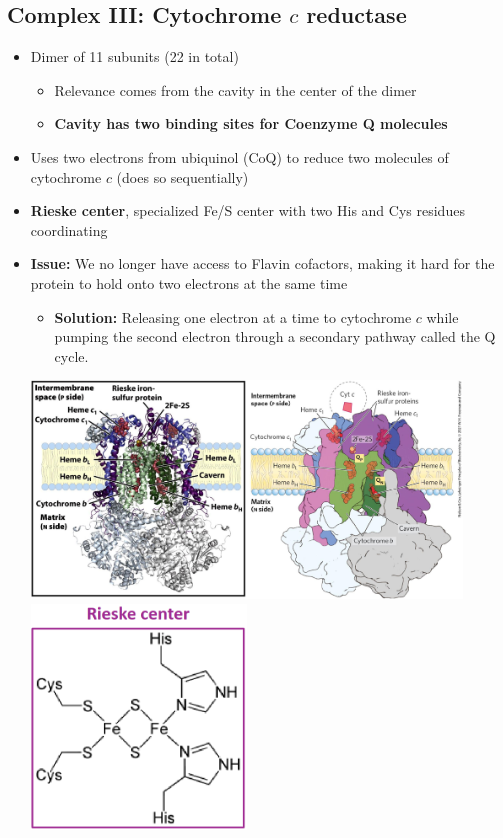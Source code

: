 \documentclass[10pt]{article}
\begin{document}
\subsection*{Complex III: Cytochrome $c$ reductase}
\begin{itemize}
	\item Dimer of 11 subunits (22 in total)
	\begin{itemize}
        \item Relevance comes from the cavity in the center of the dimer
        \item \textbf{Cavity has two binding sites for Coenzyme Q molecules}
    \end{itemize}
	\item Uses two electrons from ubiquinol (CoQ) to reduce two molecules of cytochrome $c$ (does so sequentially)
	\item \textbf{Rieske center}, specialized Fe/S center with two His and Cys residues coordinating
	\item \textbf{Issue:} We no longer have access to Flavin cofactors, making it hard for the protein to hold onto two electrons at the same time
	\begin{itemize}
        \item \textbf{Solution:} Releasing one electron at a time to cytochrome $c$ while pumping the second electron through a secondary pathway called the Q cycle.
    \end{itemize}
    \begin{center} 
        \includegraphics*[width=0.9\textwidth]{L2_11.png}\\
        \includegraphics*[width=0.45\textwidth]{L2_12.png}
    \end{center}
\end{itemize}
\end{document}
